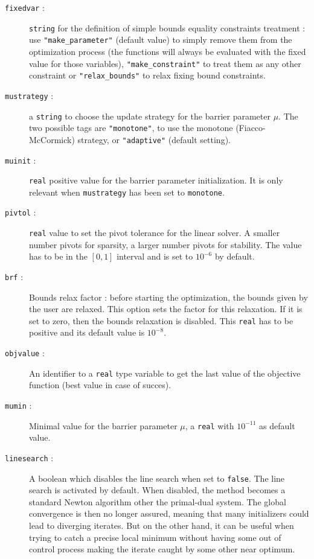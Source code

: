 \documentclass[a4paper,twoside,12pt]{book}
\begin{document}
\begin{description}
  \item[\texttt{fixedvar} :] {\tt string} for the definition of simple bounds equality constraints treatment : use {\tt "make\_parameter"} (default value) to simply remove them from the optimization process (the functions will always be evaluated with the fixed value for those variables), {\tt "make\_constraint"} to treat them as any other constraint or {\tt "relax\_bounds"} to relax fixing bound constraints.
  \item[\texttt{mustrategy} :] a {\tt string} to choose the update strategy for the barrier parameter $\mu$. The two possible tags are {\tt "monotone"}, to use the monotone (Fiacco-McCormick) strategy, or {\tt "adaptive"} (default setting).
  \item[\texttt{muinit} :] {\tt real} positive value for the barrier parameter initialization. It is only relevant when {\tt mustrategy} has been set to {\tt monotone}.
  \item[\texttt{pivtol} :] {\tt real} value to set the pivot tolerance for the linear solver. A smaller number pivots for sparsity, a larger number pivots for stability. The value has to be in the $[0,1]$ interval and is set to $10^{-6}$  by default.
  \item[\texttt{brf} :] Bounds relax factor : before starting the optimization, the bounds given by the user are relaxed. This option sets the factor for this relaxation. If it is set to zero, then the bounds relaxation is disabled. This {\tt real} has to be positive and its default value is $10^{-8}$.
  \item[\texttt{objvalue} :] An identifier to a {\tt real} type variable to get the last value of the objective function (best value in case of succes).
  \item[\texttt{mumin} :] Minimal value for the barrier parameter $\mu$, a {\tt real} with $10^{-11}$ as default value.
  \item[\texttt{linesearch} :] A boolean which disables the line search when set to {\tt false}. The line search is activated by default. When disabled, the method becomes a standard Newton algorithm other the primal-dual system. The global convergence is then no longer assured, meaning that many initializers could lead to diverging iterates. But on the other hand, it can be useful when trying to catch a precise local minimum without having some out of control process making the iterate caught by some other near optimum.
\end{description}
\end{document}

